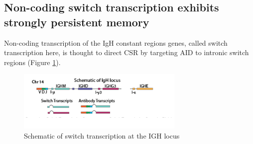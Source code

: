 \subsection{Non-coding switch transcription exhibits strongly persistent memory}

Non-coding transcription of the IgH constant regions genes, called switch transcription here, is thought to direct CSR by targeting AID to intronic switch regions  (Figure \ref{fig:paper2_IGH_schematic})\cite{stavnezer_igh_2014}. 

\begin{figure}[htb!]
\centering
\includegraphics[width=8cm, keepaspectratio]{figs/prelim_InVitro/IGH_schematic.pdf}
\caption[Schematic of switch (germline) transcription at the IGH locus]{Schematic of switch transcription at the IGH locus}
\label{fig:paper2_IGH_schematic}
\end{figure}

